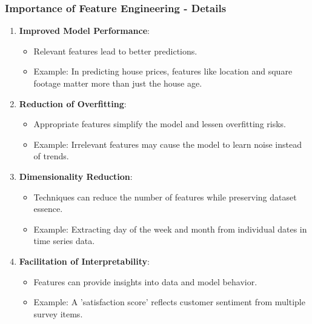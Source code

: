 \documentclass[aspectratio=169]{beamer}
\begin{document}
\begin{frame}[fragile]
    \frametitle{Importance of Feature Engineering - Details}
    \begin{enumerate}
        \item \textbf{Improved Model Performance}:
        \begin{itemize}
            \item Relevant features lead to better predictions.
            \item Example: In predicting house prices, features like location and square footage matter more than just the house age.
        \end{itemize}

        \item \textbf{Reduction of Overfitting}:
        \begin{itemize}
            \item Appropriate features simplify the model and lessen overfitting risks.
            \item Example: Irrelevant features may cause the model to learn noise instead of trends.
        \end{itemize}

        \item \textbf{Dimensionality Reduction}:
        \begin{itemize}
            \item Techniques can reduce the number of features while preserving dataset essence.
            \item Example: Extracting day of the week and month from individual dates in time series data.
        \end{itemize}

        \item \textbf{Facilitation of Interpretability}:
        \begin{itemize}
            \item Features can provide insights into data and model behavior.
            \item Example: A 'satisfaction score' reflects customer sentiment from multiple survey items.
        \end{itemize}
    \end{enumerate}
\end{frame}
\end{document}
